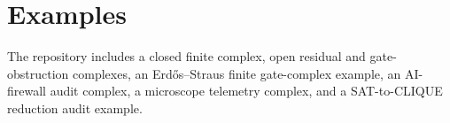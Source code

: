 \section{Examples}
The repository includes a closed finite complex, open residual and gate-obstruction complexes, an Erd\H{o}s--Straus finite gate-complex example, an AI-firewall audit complex, a microscope telemetry complex, and a SAT-to-CLIQUE reduction audit example.
